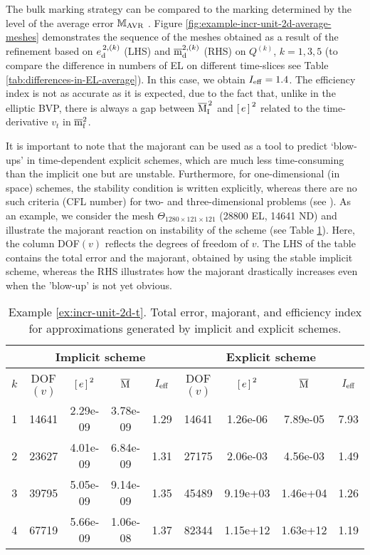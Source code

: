 \begin{example}
The bulk marking strategy can be compared to the marking determined by the level of 
the average error ${\mathbb M}_{\rm AVR}$ \cite[Algorithm 2.1]{Malietall2014}. 
Figure \ref{fig:example-incr-unit-2d-average-meshes} demonstrates the sequence of the 
meshes obtained as a result of the refinement based
on ${e}^{\,2, ({k})}_{\mathrm{d}}$ (LHS) and $\overline{\mathrm m}^{2, ({k})}_{\mathrm{d}}$ (RHS) on $Q^{(k)}$, $k = 1, 3, 5$
(to compare the difference
in numbers of EL on different time-slices see Table \ref{tab:differences-in-EL-average}). 
In this case, we obtain $I_{\rm eff} = 1.4$. The efficiency index is not as accurate 
as it is expected, due to the fact that, unlike in the elliptic BVP, there is always 
a gap between 
$\overline{\mathrm M}^{\,2}_{\mathrm{I}}$ and ${[\,e\,]\,}^2$ related to the time-derivative $v_t$ in $\overline{\mathrm m}^2_{\mathrm{f}}$.

It is important to note that the majorant can be used as a tool to predict
`blow-ups'
in time-dependent explicit schemes, which are much less \linebreak
time-consuming than the
implicit one but are unstable. 
Furthermore, for one-dimensional (in space) schemes, 
the stability condition is written explicitly, \linebreak whereas
there are no such criteria (CFL number) for two- and 
three-dimensional problems (see \cite{CourantFriedrichsLewy1967}). As an example, we consider the mesh 
$\Theta_{1280 \times 121 \times 121}$ \linebreak
(28800 EL, 14641 ND) and illustrate the majorant reaction on instability of the scheme 
(see Table \ref{tab:explicit-implicit-schemes}). Here, the column DOF$({v})$ reflects 
the degrees of freedom of $v$. 
The LHS of the table contains the total 
error and the majorant, obtained by using the stable implicit scheme, whereas the RHS 
illustrates how the majorant drastically increases even when the 'blow-up' is not yet obvious. 

\begin{table}[!ht]
\centering
\footnotesize
\begin{tabular}{c|cccc|cccc}
\multicolumn{1}{c|}{$ $}
& \multicolumn{4}{c|}{ Implicit scheme }
& \multicolumn{4}{c}{ Explicit scheme } \\
\midrule
$k$ & DOF$({v})$ & ${[\,e\,]\,}^2$ & $\overline{\mathrm M}_{}$ & $I_{\rm eff}$ & DOF$({v})$ &  ${[\,e\,]\,}^2$ & $\overline{\mathrm M}_{}$ & $I_{\rm eff}$\\
\midrule
1 & 14641 & 2.29e-09 & 3.78e-09 & 1.29 & 14641 & 1.26e-06 & 7.89e-05 & 7.93 \\
2 & 23627 & 4.01e-09 & 6.84e-09 & 1.31 & 27175 & 2.06e-03 & 4.56e-03 & 1.49 \\
3 & 39795 & 5.05e-09 & 9.14e-09 & 1.35 & 45489 & 9.19e+03 & 1.46e+04 & 1.26 \\
4 & 67719 & 5.66e-09 & 1.06e-08 & 1.37 & 82344 & 1.15e+12 & 1.63e+12 & 1.19 \\
\end{tabular}
\caption{Example \ref{ex:incr-unit-2d-t}. Total error, majorant, and efficiency index for approximations generated by implicit and explicit schemes.}
\label{tab:explicit-implicit-schemes}
\end{table}


\end{example}
